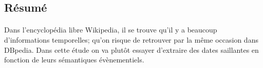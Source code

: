 \subsection*{Résumé}
\paragraph{}
Dans l'encyclopédia libre Wikipedia, il se trouve qu’il y a beaucoup d’informations temporelles; qu'on risque de retrouver par la même occasion dans DBpedia. Dans cette étude on va plutôt essayer d’extraire des dates saillantes en fonction de leurs sémantiques évènementiels.